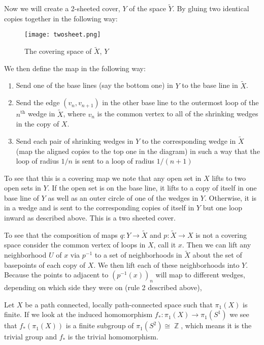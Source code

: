 \documentclass{article}
\DeclareMathOperator{\Z}{\mathbb{Z}}
\newcommand{\exercise}[1]{\noindent{\textbf{Exercise #1:}}}
\begin{document}
Now we will create a 2-sheeted cover, $Y$ of the space $\tilde{Y}$. By
gluing two identical copies together in the following way:
\begin{figure}[h!]
  \centering
  \texttt{[image: twosheet.png]}
  \caption{The covering space of $\tilde{X}$, $Y$}
\end{figure}
We then define the map in the following way:
\begin{enumerate}
\item Send one of the base lines (say the bottom one) in $Y$ to the
  base line in $\tilde{X}$.
\item Send the edge $(v_n,v_{n+1})$ in the other base line to the
  outermost loop of the $n^{\text{th}}$ wedge in $\tilde{X}$, where
  $v_n$ is the common vertex to all of the shrinking wedges in the
  copy of $X$.
\item Send each pair of shrinking wedges in $Y$ to the corresponding
  wedge in $\tilde{X}$ (map the aligned copies to the top one in the
  diagram) in such a way that the loop of radius $1/n$ is sent to a
  loop of radius $1/(n+1)$
\end{enumerate}
To see that this is a covering map we note that any open set in $X$
lifts to two open sets in $Y$. If the open set is on the base line, it
lifts to a copy of itself in one base line of $Y$ as well as an outer
circle of one of the wedges in $Y$. Otherwise, it is in a wedge and is
sent to the corresponding copies of itself in $Y$ but one loop inward
as described above. This is a two sheeted cover.

To see that the composition of maps $q: Y \to \tilde{X}$ and
$p:\tilde{X}\to X$ is not a covering space consider the common vertex
of loops in $X$, call it $x$. Then we can lift any neighborhood $U$ of
$x$ via $p^{-1}$ to a set of neighborhoods in $\tilde{X}$ about the
set of basepoints of each copy of $X$. We then lift each of these
neighborhoods into $Y$. Because the points to adjacent to
$(p^{-1}(x))_n$ will map to different wedges, depending on which side
they were on (rule 2 described above),

\exercise{1.3.7}



\exercise{1.3.9}

Let $X$ be a path connected, locally path-connected space such that
$\pi_1(X)$ is finite. If we look at the induced homomorphism $f_*:
\pi_1(X) \to \pi_1(S^1)$ we see that $f_*(\pi_1(X))$ is a finite
subgroup of $\pi_1(S^2) \cong \Z$, which means it is the trivial
group and $f_*$ is the trivial homomorphism.
\end{document}
